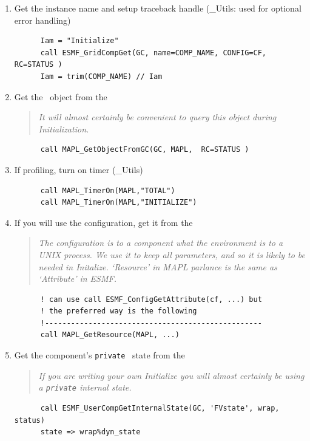 %
\begin{enumerate}
\item Get the instance name and setup traceback handle (\ggn \_Utils: used
for optional error handling)
\begin{verbatim}
      Iam = "Initialize"
      call ESMF_GridCompGet(GC, name=COMP_NAME, CONFIG=CF, RC=STATUS )
      Iam = trim(COMP_NAME) // Iam
\end{verbatim}

\item Get the \ggn\  object from the \egc
  \begin{quote} 
    {\em It will almost certainly be convenient to query
      this object during Initialization.}
  \end{quote}
\begin{verbatim}
      call MAPL_GetObjectFromGC(GC, MAPL,  RC=STATUS )
\end{verbatim}
  
\item If profiling, turn on timer  (\ggn \_Utils)
\begin{verbatim}
      call MAPL_TimerOn(MAPL,"TOTAL")
      call MAPL_TimerOn(MAPL,"INITIALIZE")
\end{verbatim}
  
\item If you will use the configuration, get it from the \egc
  \begin{quote} {\em The configuration is to a component what the
      environment is to a UNIX process. We use it to keep all
      parameters, and so it is likely to be needed in Initalize.
      `Resource' in MAPL parlance is the same as `Attribute' in ESMF.}
  \end{quote}
\begin{verbatim}
      ! can use call ESMF_ConfigGetAttribute(cf, ...) but
      ! the preferred way is the following
      !--------------------------------------------------
      call MAPL_GetResource(MAPL, ...)
\end{verbatim}
  
\item Get the component's \texttt{private} \gin\ state from the \egc
  \begin{quote} {\em If you are writing your own Initialize you will
      almost certainly be using a \texttt{private} internal state.}
  \end{quote}
\begin{verbatim}
      call ESMF_UserCompGetInternalState(GC, 'FVstate', wrap, status)
      state => wrap%dyn_state
\end{verbatim}  
  

\end{enumerate}

